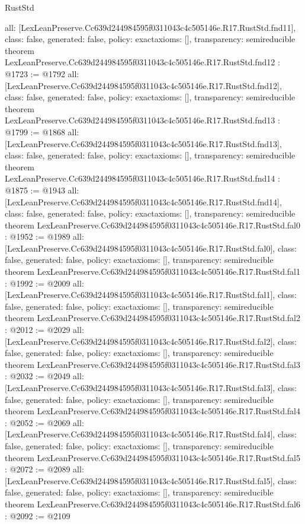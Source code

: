 \begin{lexlean}{RustStd}
\begin{coremodule}
{  all: [LexLeanPreserve.Cc639d244984595f0311043c4c505146e.R17.RustStd.fnd11],
  class: false,
  generated: false,
  policy: exact{axioms: []},
  transparency: semireducible
}
theorem LexLeanPreserve.Cc639d244984595f0311043c4c505146e.R17.RustStd.fnd12 : @1723 := @1792 {
  all: [LexLeanPreserve.Cc639d244984595f0311043c4c505146e.R17.RustStd.fnd12],
  class: false,
  generated: false,
  policy: exact{axioms: []},
  transparency: semireducible
}
theorem LexLeanPreserve.Cc639d244984595f0311043c4c505146e.R17.RustStd.fnd13 : @1799 := @1868 {
  all: [LexLeanPreserve.Cc639d244984595f0311043c4c505146e.R17.RustStd.fnd13],
  class: false,
  generated: false,
  policy: exact{axioms: []},
  transparency: semireducible
}
theorem LexLeanPreserve.Cc639d244984595f0311043c4c505146e.R17.RustStd.fnd14 : @1875 := @1943 {
  all: [LexLeanPreserve.Cc639d244984595f0311043c4c505146e.R17.RustStd.fnd14],
  class: false,
  generated: false,
  policy: exact{axioms: []},
  transparency: semireducible
}
theorem LexLeanPreserve.Cc639d244984595f0311043c4c505146e.R17.RustStd.fal0 : @1952 := @1989 {
  all: [LexLeanPreserve.Cc639d244984595f0311043c4c505146e.R17.RustStd.fal0],
  class: false,
  generated: false,
  policy: exact{axioms: []},
  transparency: semireducible
}
theorem LexLeanPreserve.Cc639d244984595f0311043c4c505146e.R17.RustStd.fal1 : @1992 := @2009 {
  all: [LexLeanPreserve.Cc639d244984595f0311043c4c505146e.R17.RustStd.fal1],
  class: false,
  generated: false,
  policy: exact{axioms: []},
  transparency: semireducible
}
theorem LexLeanPreserve.Cc639d244984595f0311043c4c505146e.R17.RustStd.fal2 : @2012 := @2029 {
  all: [LexLeanPreserve.Cc639d244984595f0311043c4c505146e.R17.RustStd.fal2],
  class: false,
  generated: false,
  policy: exact{axioms: []},
  transparency: semireducible
}
theorem LexLeanPreserve.Cc639d244984595f0311043c4c505146e.R17.RustStd.fal3 : @2032 := @2049 {
  all: [LexLeanPreserve.Cc639d244984595f0311043c4c505146e.R17.RustStd.fal3],
  class: false,
  generated: false,
  policy: exact{axioms: []},
  transparency: semireducible
}
theorem LexLeanPreserve.Cc639d244984595f0311043c4c505146e.R17.RustStd.fal4 : @2052 := @2069 {
  all: [LexLeanPreserve.Cc639d244984595f0311043c4c505146e.R17.RustStd.fal4],
  class: false,
  generated: false,
  policy: exact{axioms: []},
  transparency: semireducible
}
theorem LexLeanPreserve.Cc639d244984595f0311043c4c505146e.R17.RustStd.fal5 : @2072 := @2089 {
  all: [LexLeanPreserve.Cc639d244984595f0311043c4c505146e.R17.RustStd.fal5],
  class: false,
  generated: false,
  policy: exact{axioms: []},
  transparency: semireducible
}
theorem LexLeanPreserve.Cc639d244984595f0311043c4c505146e.R17.RustStd.fal6 : @2092 := @2109 {
}
\end{coremodule}
\end{lexlean}
